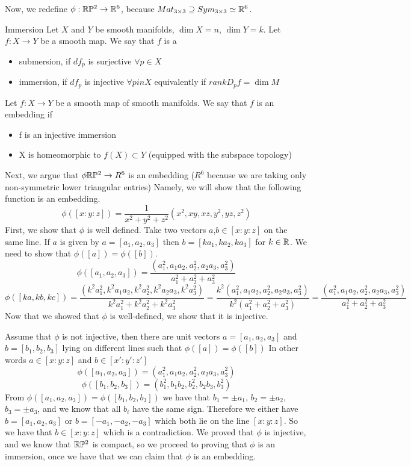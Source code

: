 \documentclass[11pt,a4paper]{report}
\begin{document}
Now, we redefine $\phi: \mathbb{R} \mathbb{P} ^2 \to \mathbb{R}^6$, because  $Mat_{3 \times 3} \supseteq Sym_{3 \times 3} \simeq \mathbb{R}^6$.
\begin{defn}{Immersion}
Let $X$ and $Y$ be smooth manifolds, $\dim X =n $, $\dim Y = k$. Let $f : X \to Y$ be a smooth map.
We say that $f$ is a
\begin{itemize}
    \item submersion, if $df_p$ is surjective $\forall p \in X$
    \item immersion, if $df_p$ is injective $\forall p in X$ equivalently if $rank D_p f = \dim M$
\end{itemize}
\end{defn}
\begin{defn}
    Let $f: X \to Y$ be a smooth map of smooth manifolds. We say that $f$ is an embedding if 
    \begin{itemize}
        \item f is an injective immersion
        \item X is homeomorphic to $f(X) \subset Y$ (equipped with the subspace topology)
    \end{itemize}
\end{defn}
Next, we argue that $\phi \mathbb{R} \mathbb{P} ^2 \to R^6$ is an embedding ($R^6$ because we are taking only non-symmetric lower triangular entries)
Namely, we will show that the following function is an embedding.
$$ \phi([x:y:z]) = \frac{1}{x^2+y^2+z^2} (x^2,xy, xz, y^2, yz, z^2) $$
First, we show that $\phi$ is well defined. Take two vectors $a$,$b \in [x:y:z]$ on the same line.
If $a$ is given by $a=[a_1,a_2,a_3]$ then $b = [k a_1, k a_2, k a_3]$ for $k \in \mathbb{R}$. We need to show that 
$\phi([a]) = \phi([b])$.
$$\phi([a_1,a_2,a_3]) = \frac{(a_1^2, a_1a_2, a_2^2, a_2a_3, a_3^2)}{a_1^2+a_2^2+a_3^2}$$
$$\phi([ka,kb,kc]) = 
\frac{(k^2 a_1^2, k^2 a_1a_2, k^2 a_2^2, k^2 a_2a_3, k^2 a_3^2)}{k^2 a_1^2+ k^2 a_2^2+ k^2 a_3^2} 
=  \frac{ k^2 (a_1^2, a_1 a_2, a_2^2, a_2a_3, a_3^2) }{ k^2 (a_1^2+a_2^2+a_3^2)  }
= \frac{(a_1^2, a_1a_2, a_2^2, a_2a_3, a_3^2)}{a_1^2+a_2^2+a_3^2} $$
Now that we showed that $\phi$ is well-defined, we show that it is injective.

Assume that $\phi$ is not injective, then there are unit vectors $a = [a_1,a_2,a_3]$ and $b=[b_1,b_2,b_3]$ lying on different lines 
such that $\phi([a]) = \phi([b])$ 
In other words $a \in [x:y:z]$  and $b \in [x\prime:y\prime:z\prime]$
$$\phi([a_1,a_2,a_3]) = (a_1^2, a_1a_2, a_2^2, a_2a_3, a_3^2)$$
$$\phi([b_1,b_2,b_3]) = (b_1^2, b_1b_2, b_2^2, b_2b_3, b_3^2)$$
From $\phi([a_1,a_2,a_3]) = \phi([b_1,b_2,b_3])$ we have that $b_1 = \pm a_1$, $b_2 = \pm a_2$, $b_3 = \pm a_3$, and we know that all $b_i$ have the same sign.
Therefore  we either have $b = [a_1, a_2, a_3]$ or $b = [-a_1, -a_2,-a_3]$ which both lie on the line $[x:y:z]$. So we have that $b \in [x:y:z]$ which is a contradiction.
\newline
We proved that $\phi$ is injective, and we know that $\mathbb{R} \mathbb{P} ^2$ is compact, so we proceed to proving that $\phi$ is an immersion, 
once we have that we can claim that $\phi$ is an embedding.
\newline
\end{document}
